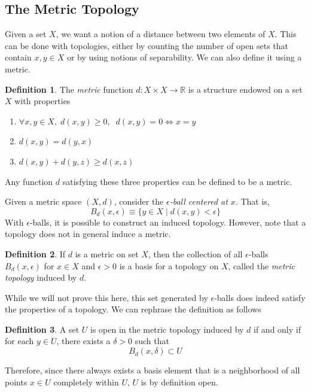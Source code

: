 \documentclass{article}
\theoremstyle{remark}
\theoremstyle{definition}
\newtheorem{definition}{Definition}[section]
\begin{document}
\subsection{The Metric Topology}
Given a set $X$, we want a notion of a distance between two elements of $X$. This can be done with topologies, either by counting the number of open sets that contain $x, y \in X$ or by using notions of separability. We can also define it using a metric. 

\begin{definition}
The \textit{metric} function $d: X \times X \longrightarrow \mathbb{R}$ is a structure endowed on a set $X$ with properties 
\begin{enumerate}
    \item $\forall x, y \in X, \; d(x, y) \geq 0, \; \; d(x, y) = 0 \iff x = y$
    \item $d(x, y) = d(y, x)$ 
    \item $d(x, y) + d(y, z) \geq d(x, z)$
\end{enumerate}
Any function $d$ satisfying these three properties can be defined to be a metric. 
\end{definition}

Given a metric space $(X, d)$, consider the \textit{$\epsilon$-ball centered at $x$}. That is, 
\[B_d (x, \epsilon) \equiv \{y \in X \; | \; d(x, y) < \epsilon\}\]
With $\epsilon$-balls, it is possible to construct an induced topology. However, note that a topology does not in general induce a metric. 

\begin{definition}
If $d$ is a metric on set $X$, then the collection of all $\epsilon$-balls $B_d (x, \epsilon)$ for $x \in X$ and $\epsilon > 0$ is a basis for a topology on $X$, called the \textit{metric topology} induced by $d$. 
\end{definition}

While we will not prove this here, this set generated by $\epsilon$-balls does indeed satisfy the properties of a topology. We can rephrase the definition as follows 

\begin{definition}
A set $U$ is open in the metric topology induced by $d$ if and only if for each $y \in U$, there exists a $\delta > 0$ such that 
\[B_d (x, \delta) \subset U\]
\end{definition}
Therefore, since there always exists a basis element that is a neighborhood of all points $x \in U$ completely within $U$, $U$ is by definition open. 
\end{document}
